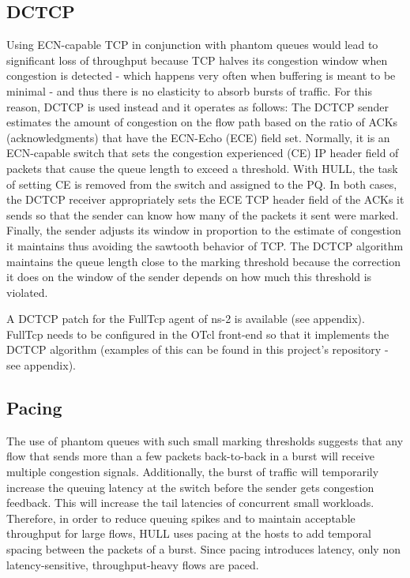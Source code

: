 \documentclass[10pt,conference,compsocconf]{IEEEtran}
\begin{document}
\subsection{DCTCP}
Using ECN-capable TCP in conjunction with phantom queues would lead to significant loss of throughput because TCP halves its congestion window when congestion is detected - which happens very often when buffering is meant to be minimal - and thus there is no elasticity to absorb bursts of traffic. For this reason, DCTCP is used instead and it operates as follows: The DCTCP sender estimates the amount of congestion on the flow path based on the ratio of ACKs (acknowledgments) that have the ECN-Echo (ECE) field set. Normally, it is an ECN-capable switch that sets the congestion experienced (CE) IP header field of packets that cause the queue length to exceed a threshold. With HULL, the task of setting CE is removed from the switch and assigned to the PQ. In both cases, the DCTCP receiver appropriately sets the ECE TCP header field of the ACKs it sends so that the sender can know how many of the packets it sent were marked. Finally, the sender adjusts its window in proportion to the estimate of congestion it maintains thus avoiding the sawtooth behavior of TCP. The DCTCP algorithm  maintains the queue length close to the marking threshold because the correction it does on the window of the sender depends on how much this threshold is violated.

A DCTCP patch for the FullTcp agent of ns-2 is available (see appendix). FullTcp needs to be configured in the OTcl front-end so that it implements the DCTCP algorithm (examples of this can be found in this project's repository - see appendix).

\subsection{Pacing}
The use of phantom queues with such small marking thresholds suggests that any flow that sends more than a few packets back-to-back in a burst will receive multiple congestion signals. Additionally, the burst of traffic will temporarily increase the queuing latency at the switch before the sender gets congestion feedback. This will increase the tail latencies of concurrent small workloads. Therefore, in order to reduce queuing spikes and to maintain acceptable throughput for large flows, HULL uses pacing at the hosts to add temporal spacing between the packets of a burst. Since pacing introduces latency, only non latency-sensitive, throughput-heavy flows are paced. 
\end{document}
